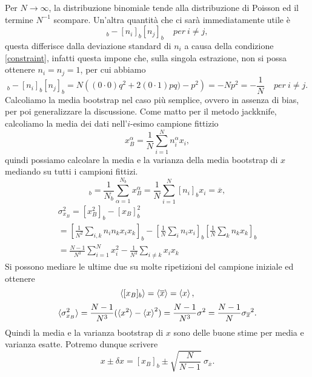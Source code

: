 \documentclass[LaM]{sapthesis}
\begin{document}
	Per $N\to \infty$, la distribuzione binomiale tende alla distribuzione di Poisson ed il termine $N^{-1}$ scompare. Un'altra quantità che ci sarà immediatamente utile è
	\begin{equation*}
		[n_in_j]_b-[n_i]_b[n_j]_b \ \ \ \ \ per \ i\ne j,
	\end{equation*}
	questa differisce dalla deviazione standard di $n_i$ a causa della condizione \eqref{constraint}, infatti questa impone che, sulla singola estrazione, non si possa ottenere $n_i=n_j=1$, per cui abbiamo
	\begin{equation}
		[n_in_j]_b-[n_i]_b[n_j]_b=N\left((0\cdot 0) q^2 + 2(0\cdot 1)pq)-p^2\right)=-Np^2=-\frac{1}{N} \ \ \ \ \ per \ i\ne j.
	\end{equation}
	Calcoliamo la media bootstrap nel caso più semplice, ovvero in assenza di bias, per poi generalizzare la discussione. Come matto per il metodo jackknife, calcoliamo la media dei dati nell'$i$-esimo campione fittizio
	\begin{equation}
		x^\alpha_B=\frac{1}{N}\sum_{i=1}^{N}n^\alpha_ix_i,
	\end{equation}
	quindi possiamo calcolare la media e la varianza della media bootstrap di $x$ mediando su tutti i campioni fittizi.
	\begin{equation}
		[x_B]_b=\frac{1}{N_b}\sum_{\alpha=1}^{N_b}x^\alpha_B=\frac{1}{N}\sum_{i=1}^{N}[n_i]_bx_i=\overline{x},
	\end{equation}
	\begin{multline}
		\sigma^2_{x_B}=[x_B^2]_b-[x_B]_b^2\\
		=\left[\frac{1}{N^2}\sum_{i,k}n_i n_k x_ix_k\right]_b-\left[\frac{1}{N}\sum_{i}n_i x_i\right]_b\left[\frac{1}{N}\sum_{k}n_k x_k\right]_b \\
		=\frac{N-1}{N^3}\sum_{i=1}^{N}x_i^2-\frac{1}{N^3}\sum_{i\ne k}x_ix_k
	\end{multline}
	Si possono mediare le ultime due su molte ripetizioni del campione iniziale ed ottenere
	\begin{equation}
		\braket{[x_B]_b}=\braket{\overline{x}}=\braket{x},
	\end{equation}
	\begin{equation}
		\braket{\sigma^2_{x_B}}=\frac{N-1}{N^3}(\braket{x^2}-\braket{x}^2)=\frac{N-1}{N^3}\sigma^2=\frac{N-1}{N} {\sigma_{\overline{x}}}^2.
	\end{equation}
	Quindi la media e la varianza bootstrap di $x$ sono delle buone stime per media e varianza esatte. Potremo dunque scrivere
	\begin{equation}
		x \pm \delta x=[x_B]_b \pm \sqrt{\frac{N}{N-1}} \ \sigma_{\overline{x}}.
	\end{equation}
\end{document}
